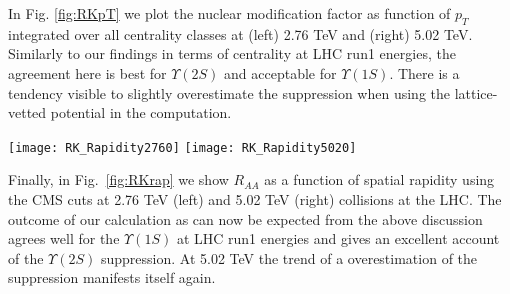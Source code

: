 In Fig. \ref{fig:RKpT} we plot the nuclear modification factor as function of $p_{T}$ integrated over all centrality classes at (left) 2.76 TeV and (right) 5.02 TeV. Similarly to our findings in terms of centrality at LHC run1 energies, the agreement here is best for $\Upsilon(2S)$ and acceptable for $\Upsilon(1S)$. There is a tendency visible to slightly overestimate the suppression when using the lattice-vetted potential in the computation.

\begin{figure*}[h]
\centerline{
\texttt{[image: RK\_Rapidity2760]}
\texttt{[image: RK\_Rapidity5020]}
}
\caption{
(Color online) $R_{AA}$ as a function of spatial rapidity $y$ compared to CMS data taken at the LHC for 2.76 TeV (left) and 5.02 TeV (right) Pb-Pb collisions. Similar to the $p_T$ plots, at LHC run1 energies we observe good agreement with the $\Upsilon(1S)$ data and the $\Upsilon(2S)$ suppression is very well reproduced. At 5.02 TeV the experimentally determined suppression appears slightly weaker than what our calculation predicts.
}
\label{fig:RKrap}
\end{figure*}

Finally, in Fig.~\ref{fig:RKrap} we show $R_{AA}$ as a function of spatial rapidity using the CMS cuts at 2.76 TeV (left) and 5.02 TeV (right) collisions at the LHC. The outcome of our calculation as can now be expected from the above discussion agrees well for the $\Upsilon(1S)$ at LHC run1 energies and gives an excellent account of the $\Upsilon(2S)$ suppression. At 5.02 TeV the trend of a overestimation of the suppression manifests itself again.

